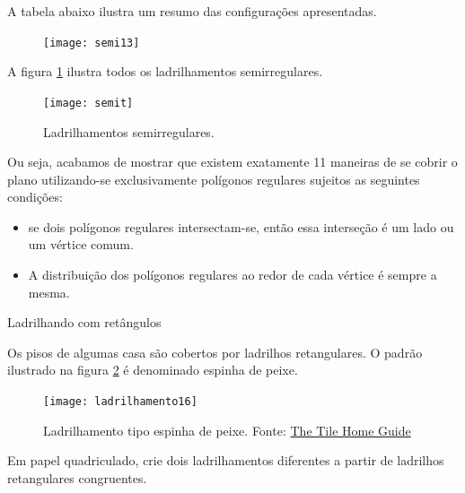 A tabela abaixo ilustra um resumo das configurações apresentadas.


 \begin{figure}[H]
\centering
\texttt{[image: semi13]}

\end{figure}

A figura \ref{semit} ilustra todos os ladrilhamentos semirregulares.


\begin{figure}[H]
\centering
\texttt{[image: semit]}
\label{semit}
\caption{Ladrilhamentos semirregulares.}
\end{figure}

Ou seja, acabamos de mostrar que existem exatamente 11 maneiras de se cobrir o plano utilizando-se exclusivamente polígonos regulares sujeitos as seguintes condições:
\begin{itemize}
\item se dois polígonos regulares intersectam-se, então essa interseção é um lado ou um vértice comum.
\item A distribuição dos polígonos regulares ao redor de cada vértice é sempre a mesma.
\end{itemize}







\begin{task}{Ladrilhando com retângulos} \label{at_outros1}

Os pisos de algumas casa são cobertos por ladrilhos retangulares. O padrão ilustrado na figura \ref{peixe} é denominado espinha de peixe. 

	\begin{figure}[H]
	\centering
	\texttt{[image: ladrilhamento16]}
\label{peixe}
	\caption{Ladrilhamento tipo espinha de peixe. Fonte: \href{http://www.tilehomeguide.com/tile-patterns-the-ultimate-quick-read-beginners-guide-including-secrets-of-tile-professionals-revealed/}{The Tile Home Guide}}
	\end{figure}

 Em papel quadriculado, crie dois ladrilhamentos  diferentes a partir de ladrilhos retangulares congruentes.

\end{task}


